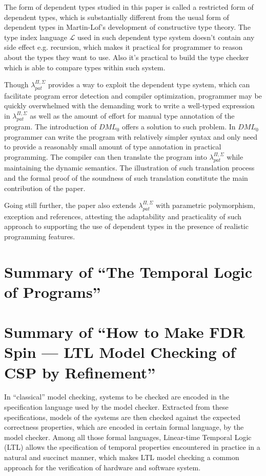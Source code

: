 \documentclass{llncs}
\newcommand{\dmlL}{$\mathcal{L}$}
\newcommand{\dmllamall}{$\lambda_{pat}^{\Pi,\Sigma}$}
\newcommand{\dmlzero}{$DML_0$}
\begin{document}
The form of dependent
types studied in this paper is called a restricted form of dependent types,
which is substantially different from the usual form of dependent types in
Martin-Lof’s development of constructive type theory. The type index language
\dmlL{} used in such dependent type system doesn't contain any side
effect e.g. recursion, which makes it practical for
programmer to reason about the types they want to use. Also it’s practical
to build the type checker which is able to compare types within such system.

Though \dmllamall{} provides a way to exploit the dependent type system, 
which can facilitate program error detection and
compiler optimization, programmer may be quickly overwhelmed with the
demanding work to write a well-typed expression in \dmllamall{} as well as the
amount of effort for manual type annotation of the program. The introduction
of \dmlzero{} offers a solution to such problem. In \dmlzero{} programmer can write the
program with relatively simpler syntax and only need to provide a reasonably
small amount of type annotation in practical programming. The compiler can
then translate the program into \dmllamall{} while maintaining the dynamic
semantics. The illustration of such translation process and the formal proof
of the soundness of such translation constitute the main contribution of
the paper.

Going still further, the paper also extends \dmllamall{} with 
parametric polymorphism, exception
and references, attesting the adaptability and practicality of such approach
to supporting the use of dependent types in the presence of realistic
programming features.


\newpage 
\section{Summary of ``The Temporal Logic of Programs''
  \cite{Pnueli1977Temporal}}
  \label{section:LTL}

\newpage 
\section{Summary of ``How to Make FDR Spin --- LTL Model Checking of CSP by
Refinement''\cite{Leuschel2001How}}
  \label{section:FDRSPIN}

In ``classical'' model checking, systems to be checked are encoded in the
specification language used by the model checker. Extracted from these
specifications, models of the systems are then checked against the expected
correctness properties, which are encoded in certain formal language, by the
model checker. Among all those formal languages, Linear-time Temporal Logic 
(LTL) allows the specification of temporal properties encountered in practice
 in a natural and succinct manner, which makes LTL model checking a common
approach for the verification of hardware and software system.
\end{document}
